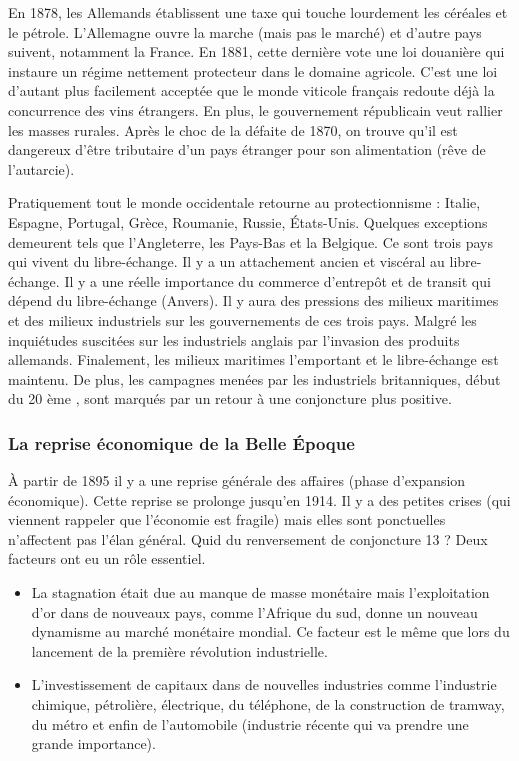 \documentclass[12pt]{report}
\begin{document}
En 1878, les Allemands établissent une taxe qui touche lourdement les céréales et le pétrole.
L’Allemagne ouvre la marche (mais pas le marché) et d’autre pays suivent, notamment la
France. En 1881, cette dernière vote une loi douanière qui instaure un régime nettement
protecteur dans le domaine agricole. C’est une loi d’autant plus facilement acceptée que le
monde viticole français redoute déjà la concurrence des vins étrangers. En plus, le
gouvernement républicain veut rallier les masses rurales. Après le choc de la défaite de 1870,
on trouve qu’il est dangereux d’être tributaire d’un pays étranger pour son alimentation (rêve
de l’autarcie).

Pratiquement tout le monde occidentale retourne au protectionnisme : Italie, Espagne,
Portugal, Grèce, Roumanie, Russie, États-Unis. Quelques exceptions demeurent tels que
l’Angleterre, les Pays-Bas et la Belgique. Ce sont trois pays qui vivent du libre-échange. Il y a
un attachement ancien et viscéral au libre-échange. Il y a une réelle importance du commerce
d’entrepôt et de transit qui dépend du libre-échange (Anvers). Il y aura des pressions des
milieux maritimes et des milieux industriels sur les gouvernements de ces trois pays. Malgré
les inquiétudes suscitées sur les industriels anglais par l’invasion des produits allemands.
Finalement, les milieux maritimes l’emportant et le libre-échange est maintenu. De plus, les
campagnes menées par les industriels britanniques, début du 20 ème , sont marqués par un retour
à une conjoncture plus positive.

\subsubsection{La reprise économique de la Belle Époque}

À partir de 1895 il y a une reprise générale des affaires (phase d’expansion économique).
Cette reprise se prolonge jusqu’en 1914. Il y a des petites crises (qui viennent rappeler que
l’économie est fragile) mais elles sont ponctuelles n’affectent pas l’élan général. Quid du
renversement de conjoncture 13 ? Deux facteurs ont eu un rôle essentiel.

\begin{itemize}
\item La stagnation était due au manque de masse monétaire mais l’exploitation d’or dans de
nouveaux pays, comme l’Afrique du sud, donne un nouveau dynamisme au marché
monétaire mondial. Ce facteur est le même que lors du lancement de la première
révolution industrielle.
\item L’investissement de capitaux dans de nouvelles industries comme l’industrie
chimique, pétrolière, électrique, du téléphone, de la construction de tramway, du métro
et enfin de l’automobile (industrie récente qui va prendre une grande importance).
\end{itemize}
\end{document}
